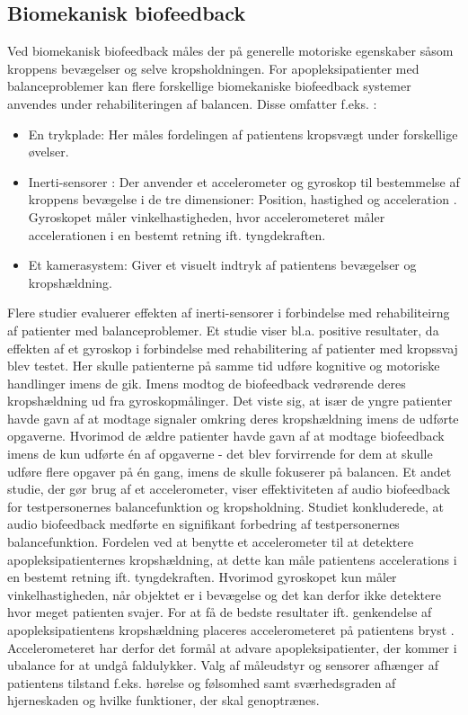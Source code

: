 \subsection{Biomekanisk biofeedback}
Ved biomekanisk biofeedback måles der på generelle motoriske egenskaber såsom kroppens bevægelser og selve kropsholdningen. For apopleksipatienter med balanceproblemer kan flere forskellige biomekaniske biofeedback systemer anvendes under rehabiliteringen af balancen. Disse omfatter f.eks. \cite{Giggins2013}:
\begin{itemize}
\item En trykplade: Her måles fordelingen af patientens kropsvægt under forskellige øvelser. 
\item Inerti-sensorer : Der anvender et accelerometer og gyroskop til bestemmelse af kroppens bevægelse i de tre dimensioner: Position, hastighed og acceleration . Gyroskopet måler vinkelhastigheden, hvor accelerometeret måler accelerationen i en bestemt retning ift. tyngdekraften.
\item Et kamerasystem: Giver et visuelt indtryk af patientens bevægelser og kropshældning. 
\end{itemize}

Flere studier evaluerer effekten af inerti-sensorer i forbindelse med rehabiliteirng af patienter med balanceproblemer. Et studie viser bl.a. positive resultater, da effekten af et gyroskop i forbindelse med rehabilitering af patienter med kropssvaj blev testet. Her skulle patienterne på samme tid udføre kognitive og motoriske handlinger imens de gik. Imens modtog de biofeedback vedrørende deres kropshældning ud fra gyroskopmålinger. Det viste sig, at især de yngre patienter havde gavn af at modtage signaler omkring deres kropshældning imens de udførte opgaverne. Hvorimod de ældre patienter havde gavn af at modtage biofeedback imens de kun udførte én af opgaverne - det blev forvirrende for dem at skulle udføre flere opgaver på én gang, imens de skulle fokuserer på balancen. Et andet studie, der gør brug af et accelerometer, viser effektiviteten af audio biofeedback for testpersonernes balancefunktion og kropsholdning. Studiet konkluderede, at audio biofeedback  medførte en signifikant forbedring af testpersonernes balancefunktion. \cite{Giggins2013}
Fordelen ved at benytte et accelerometer til at detektere apopleksipatienternes kropshældning, at dette kan måle patientens accelerations i en bestemt retning ift. tyngdekraften. Hvorimod gyroskopet kun måler vinkelhastigheden, når objektet er i bevægelse og det kan derfor ikke detektere hvor meget patienten svajer. For at få de bedste resultater ift. genkendelse af apopleksipatientens kropshældning placeres accelerometeret på patientens bryst \cite{Gjoreski2011}. Accelerometeret har derfor det formål at advare apopleksipatienter, der kommer i ubalance for at undgå faldulykker. 
Valg af måleudstyr og sensorer afhænger af patientens tilstand f.eks. hørelse og følsomhed samt sværhedsgraden af hjerneskaden og hvilke funktioner, der skal genoptrænes. \cite{Hjaelpemiddelbasen}

